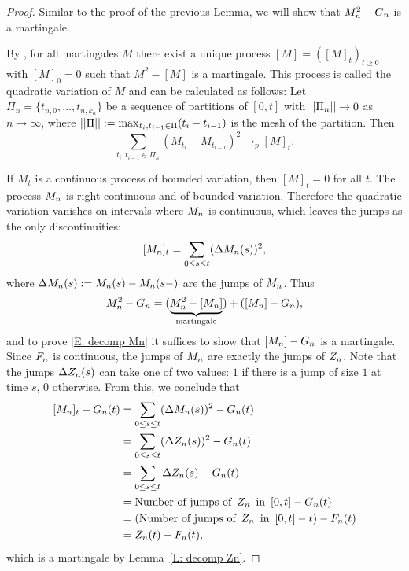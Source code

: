 \begin{proof} \label{P: decomp Mn}
	Similar to the proof of the previous Lemma, we will show that $M_n^2 - G_n$ is a martingale.
	
	By \cite[Theorem 21.70, p.471]{Klenke.2006}, 
	for all martingales $M$ there exist a unique process $[M] = ([M]_t)_{t\geq 0}$ with $[M]_0 = 0$ such that
	$M^2 - [M]$	is a martingale.
	This process is called the quadratic variation of $M$ and can be calculated as follows:
	Let $\Pi_n = \{ t_{n,0}, \dots, t_{n,k_n} \}$ be a sequence of partitions of $[0,t]$
	with $||\Pi_n|| \rightarrow 0$ as $n \rightarrow \infty$, 
	where $||\Pi|| := \max_{t_i, t_{i-1} \in \Pi} (t_i - t_{i-1})$ is the mesh of the partition.
	Then
	\begin{equation} \label{E: def quadratic variation}
		\sum_{t_i, t_{i-1} \in \Pi_n}(M_{t_i} - M_{t_{i-1}})^2 \rightarrow_p [M]_t.
	\end{equation}
	
	If $M_t$ is a continuous process of bounded variation, then $[M]_t = 0$ for all $t$.
	The process $M_n$ is right-continuous and of bounded variation.
	Therefore the quadratic variation vanishes on intervals where $M_n$ is continuous, 
	which leaves the jumps as the only discontinuities:
	\begin{equation}
	[M_n]_{t} = \sum_{0 \leq s \leq t} (\Delta M_n(s))^2,
	\end{equation}
	where $\Delta M_n(s) := M_n(s) - M_n(s-)$ are the jumps of $M_n$. \label{I: DeltaX}
	Thus
	\begin{equation}
	M_n^2 - G_n = (\underbrace{M_n^2 - [M_n]}_{\text{martingale}}) + ([M_n] - G_n),
	\end{equation}
	and to prove \eqref{E: decomp Mn} it suffices to show that $[M_n] - G_n$ is a martingale.
	Since $F_n$ is continuous, the jumps of $M_n$ are exactly the jumps of $Z_n$.
	Note that the jumps $\Delta Z_n(s)$ can take one of two values: 
	$1$ if there is a jump of size $1$ at time $s$, 0 otherwise.
	From this, we conclude that
	\begin{align*}
	[M_n]_{t} - G_n(t)
	&= \sum_{0 \leq s \leq t} (\Delta M_n(s))^2 - G_n(t) \\
	&= \sum_{0 \leq s \leq t} (\Delta Z_n(s))^2 - G_n(t) \\
	&= \sum_{0 \leq s \leq t} \Delta Z_n(s) - G_n(t) \\
	&= \text{Number of jumps of} \enspace Z_n \enspace \text{in} \enspace [0,t] - G_n(t) \\
	&= (\text{Number of jumps of} \enspace Z_n \enspace \text{in} \enspace [0,t] - t) - F_n(t) \\
	&= Z_n(t) - F_n(t),
	\end{align*}
	which is a martingale by Lemma~\ref{L: decomp Zn}.
\end{proof}





